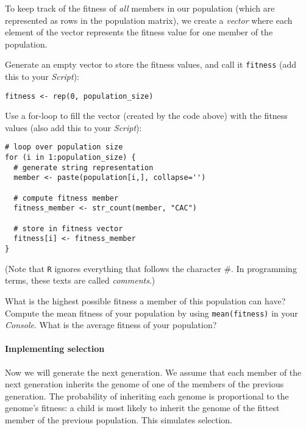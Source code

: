 \documentclass[a4paper, 9pt]{article}
\begin{document}
To keep track of the fitness of \textit{all} members in our population
(which are represented as rows in the population matrix), we create a
\textit{vector} where each element of the vector represents
the fitness value for one member of the population.

\begin{exercise}
    \action Generate an empty vector to store the fitness values, and call it \texttt{fitness} (add this to your \emph{Script}):
    \begin{lstlisting}
fitness <- rep(0, population_size)
    \end{lstlisting}
    \action Use a for-loop to fill the vector (created by the code above) with the fitness values (also add this to your \emph{Script}):
    \begin{lstlisting}
# loop over population size
for (i in 1:population_size) {      
  # generate string representation
  member <- paste(population[i,], collapse='') 
  
  # compute fitness member   
  fitness_member <- str_count(member, "CAC")   
  
  # store in fitness vector
  fitness[i] <- fitness_member
}
\end{lstlisting}
    
    (Note that \texttt{R} ignores everything that follows the character \#. In programming terms, these texts are called \textit{comments}.)
    
    What is the highest possible fitness a member of this population can have?
    \action Compute the mean fitness of your population by using \verb|mean(fitness)| in your \emph{Console}.
    What is the average fitness of your population?
\end{exercise}

\paragraph{Implementing selection} Now we will generate the next generation. We assume that each member of
the next generation inherits the genome of one of the members of the
previous generation. The probability of inheriting each genome is
proportional to the genome's fitness: a child is most likely to inherit
the genome of the fittest member of the previous population. This
simulates selection.
\end{document}
